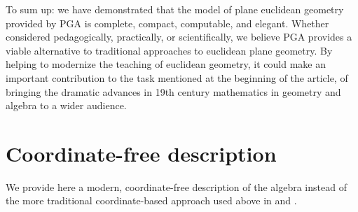 \documentclass[12pt]{article}
\newcommand{\fvsh}[2]{\ifthenelse{\equal{\isFV}{true}}{#1}{#2}}
\begin{document}
To sum up:  we have demonstrated that the model of plane euclidean geometry provided by PGA is complete, compact, computable, and elegant.  Whether considered pedagogically, practically, or scientifically, we believe PGA provides a viable alternative to traditional approaches to euclidean plane geometry.   By helping to modernize the teaching of euclidean geometry, it could make an important contribution to the task mentioned at the beginning of the article, of bringing the dramatic advances in 19th century mathematics in geometry and algebra to a wider audience.  




\appendix
\renewcommand{\appendixtocname}{Appendix}
\appendixpage
\section{Coordinate-free description}
\label{sec:cfd}
We provide here a modern, coordinate-free description of the algebra instead of the more traditional coordinate-based approach used above in  and .  %
\end{document}
